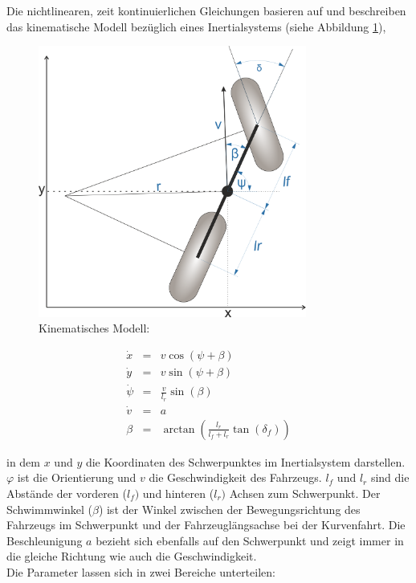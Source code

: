\documentclass{like}
\begin{document}
Die nichtlinearen, zeit kontinuierlichen Gleichungen basieren auf \cite{rajamani2011vehicle, 7225830} und beschreiben das kinematische Modell bezüglich eines Inertialsystems (siehe Abbildung \ref{fig:kinmodel}),

\begin{figure}[ht!]
	\centering
	\includegraphics[width=250pt]{Abbildungen/kinBicycle.png}
	\caption{Kinematisches Modell:}
	\label{fig:kinmodel}
\end{figure}

\begin{eqnarray}
\label{kinDiscrete}
\dot{x}   &= &v  \cos(\psi + \beta)\\
\dot{y}   &= &v  \sin(\psi + \beta)\\
\dot{\psi} &= &\frac{v}{l_r} \sin(\beta) \\
\dot{v}    &= &a \\
\beta      &= &\arctan(\frac{l_r}{l_f + l_r} \tan(\delta_f))
\end{eqnarray}

in dem \(x\) und \(y\) die Koordinaten des Schwerpunktes im Inertialsystem darstellen. 
\(\varphi\) ist die Orientierung und \(v\) die Geschwindigkeit des Fahrzeugs. \(l_f\) und \(l_r\) sind die Abstände der vorderen (\(l_f)\) und hinteren (\(l_r)\) Achsen zum Schwerpunkt.
Der Schwimmwinkel (\(\beta\)) ist der Winkel  zwischen der Bewegungsrichtung des Fahrzeugs im Schwerpunkt und der Fahrzeuglängsachse bei der Kurvenfahrt. Die Beschleunigung \(a\) bezieht sich ebenfalls auf den Schwerpunkt und zeigt immer in die gleiche Richtung wie auch die Geschwindigkeit. \\
Die Parameter lassen sich in zwei Bereiche unterteilen:
\end{document}
